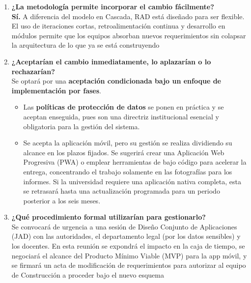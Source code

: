 \documentclass[pdflatex,sn-mathphys-num]{sn-jnl}%
\theoremstyle{thmstyleone}%
\theoremstyle{thmstyletwo}%
\theoremstyle{thmstylethree}%
\begin{document}
\begin{enumerate}
	 	\item \textbf{¿La metodología permite incorporar el cambio fácilmente?} \\
	 	\textbf{Sí.} A diferencia del modelo en Cascada, RAD está diseñado para ser flexible. El uso de iteraciones cortas, retroalimentación continua y desarrollo en módulos permite que los equipos absorban nuevos requerimientos sin colapsar la arquitectura de lo que ya se está construyendo
	 	
	 	\item \textbf{¿Aceptarían el cambio inmediatamente, lo aplazarían o lo rechazarían?} \\
	Se optará por una \textbf{aceptación condicionada bajo un enfoque de implementación por fases}.
	\begin{itemize}
		\item Las \textbf{políticas de protección de datos} se ponen en práctica y se aceptan enseguida, pues son una directriz institucional esencial y obligatoria para la gestión del sistema.
		
		\item Se acepta la aplicación móvil, pero su gestión se realiza dividiendo su alcance en los plazos fijados. Se sugerirá crear una Aplicación Web Progresiva (PWA) o emplear herramientas de bajo código para acelerar la entrega, concentrando el trabajo solamente en las fotografías para los informes. Si la universidad requiere una aplicación nativa completa, esta se retrasará hasta una actualización programada para un periodo posterior a los seis meses. 
		
	\end{itemize}
	 	
	 	\item \textbf{¿Qué procedimiento formal utilizarían para gestionarlo?} \\
	 	Se convocará de urgencia a una sesión de Diseño Conjunto de Aplicaciones (JAD) con las autoridades, el departamento legal (por los datos sensibles) y los docentes. En esta reunión se expondrá el impacto en la caja de tiempo, se negociará el alcance del Producto Mínimo Viable (MVP) para la app móvil, y se firmará un acta de modificación de requerimientos para autorizar al equipo de Construcción a proceder bajo el nuevo esquema 
 \end{enumerate}
\end{document}
